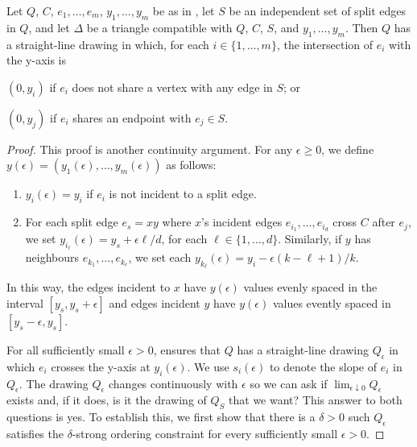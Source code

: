 \documentclass{patmorin}
\begin{document}
\begin{thm}
   Let $Q$, $C$, $e_1,\ldots,e_m$, $y_1,\ldots,y_m$ be as in
  , let $S$ be an independent set of split edges in $Q$,
  and let $\Delta$ be a triangle compatible with $Q$, $C$, $S$, and
  $y_1,\ldots,y_m$.  Then $Q$ has a straight-line drawing in which, for
  each $i\in\{1,\ldots,m\}$, the intersection of $e_i$ with the y-axis is
  \begin{compactenum}
     \item $(0,y_i)$ if $e_i$ does not share a vertex with any edge in $S$; or
     \item $(0,y_j)$ if $e_i$ shares an endpoint with $e_j\in S$.
  \end{compactenum}
\end{thm}

\begin{proof}
  This proof is another continuity argument. For any $\epsilon \ge 0$, we define
  $y(\epsilon)=(y_1(\epsilon),\ldots,y_m(\epsilon))$ as follows:
  \begin{enumerate}
    \item $y_i(\epsilon)= y_i$ if $e_i$ is not incident to a split edge.
    \item For each split edge $e_s=xy$ where $x$'s incident edges
  $e_{i_1},\ldots,e_{i_d}$ cross $C$ after $e_j$, we
  set $y_{i_\ell}(\epsilon)=y_s+\epsilon\ell/d$, for each
  $\ell\in\{1,\ldots,d\}$.  Similarly, if $y$ has neighbours
  $e_{k_1},\ldots,e_{k_r}$, we set each $y_{k_\ell}(\epsilon)=y_i -
  \epsilon(k-\ell+1)/k$. 
  \end{enumerate}
  In this way, the edges incident to $x$ have $y(\epsilon)$ values evenly
  spaced in the interval $[y_s,y_s+\epsilon]$ and edges incident $y$
  have $y(\epsilon)$ values evently spaced in $[y_s-\epsilon,y_s]$.

  For all sufficiently small $\epsilon >0$,  ensures that
  $Q$ has a straight-line drawing $Q_\epsilon$ in which $e_i$ crosses
  the y-axis at $y_i(\epsilon)$. We use $s_i(\epsilon)$ to denote the
  slope of $e_i$ in $Q_\epsilon$.  The drawing $Q_\epsilon$ changes
  continuously with $\epsilon$ so we can ask if $\lim_{\epsilon\downarrow
  0}Q_\epsilon$ exists and, if it does, is it the drawing of $Q_S$ that
  we want?  This answer to both questions is yes.  To establish this,
  we first show that there is a $\delta>0$ such $Q_\epsilon$ satisfies
  the $\delta$-strong ordering constraint for every sufficiently small
  $\epsilon >0$.


\end{proof}
\end{document}
